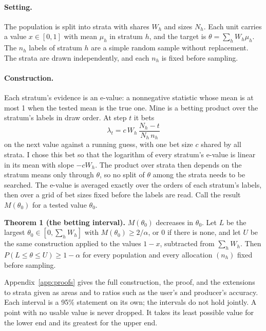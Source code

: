 \documentclass[11pt,a4paper]{article}
\begin{document}
\paragraph{Setting.} The population is split into strata with shares $W_h$ and sizes $N_h$. Each unit carries a value
$x \in [0,1]$ with mean $\mu_h$ in stratum $h$, and the target is $\theta = \sum_h W_h \mu_h$. The $n_h$ labels of
stratum $h$ are a simple random sample without replacement. The strata are drawn independently, and each $n_h$ is
fixed before sampling.

\paragraph{Construction.} Each stratum's evidence is an e-value: a nonnegative statistic whose mean is at most 1 when
the tested mean is the true one. Mine is a betting product over the stratum's labels in draw order. At step $t$ it
bets
\begin{equation}
  \lambda_t = c\, W_h\, \frac{N_h - t}{N_h\, n_h}
  \label{eq:bet}
\end{equation}
on the next value against a running guess, with one bet size $c$ shared by all strata. I chose this bet so that the
logarithm of every stratum's e-value is linear in its mean with slope $-c W_h$. The product over strata then depends
on the stratum means only through $\theta$, so no split of $\theta$ among the strata needs to be searched. The
e-value is averaged exactly over the orders of each stratum's labels, then over a grid of bet sizes fixed before the
labels are read. Call the result $M(\theta_0)$ for a tested value $\theta_0$.

\textbf{Theorem 1 (the betting interval).} $M(\theta_0)$ decreases in $\theta_0$. Let $L$ be the largest
$\theta_0 \in [0, \sum_h W_h]$ with $M(\theta_0) \ge 2/\alpha$, or 0 if there is none, and let $U$ be the same
construction applied to the values $1 - x$, subtracted from $\sum_h W_h$. Then $P(L \le \theta \le U) \ge 1 - \alpha$
for every population and every allocation $(n_h)$ fixed before sampling.

Appendix~\ref{app:proofs} gives the full construction, the proof, and the extensions to strata given as areas and to
ratios such as the user's and producer's accuracy. Each interval is a 95\% statement on its own; the intervals do
not hold jointly. A point with no usable value is never dropped. It takes its least possible value for the lower end
and its greatest for the upper end.
\end{document}
